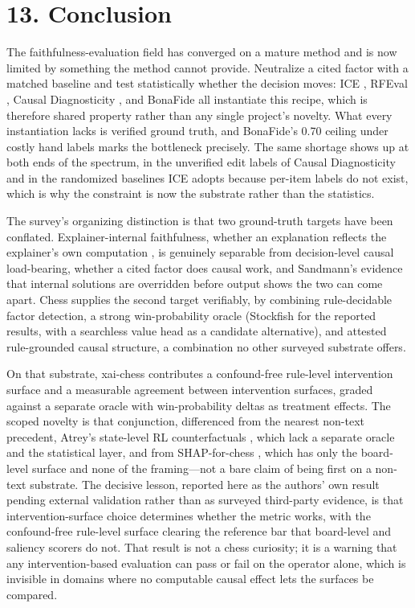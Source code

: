 \documentclass[conference]{IEEEtran}
\begin{document}
\section*{13. Conclusion}
The faithfulness-evaluation field has converged on a mature method and is now limited by something the method cannot provide. Neutralize a cited factor with a matched baseline and test statistically whether the decision moves: ICE \cite{ref17}, RFEval \cite{ref16}, Causal Diagnosticity \cite{ref15}, and BonaFide \cite{ref14} all instantiate this recipe, which is therefore shared property rather than any single project's novelty. What every instantiation lacks is verified ground truth, and BonaFide's 0.70 ceiling under costly hand labels \cite{ref14} marks the bottleneck precisely. The same shortage shows up at both ends of the spectrum, in the unverified edit labels of Causal Diagnosticity \cite{ref15} and in the randomized baselines ICE \cite{ref17} adopts because per-item labels do not exist, which is why the constraint is now the substrate rather than the statistics.

The survey's organizing distinction is that two ground-truth targets have been conflated. Explainer-internal faithfulness, whether an explanation reflects the explainer's own computation \cite{ref30}, is genuinely separable from decision-level causal load-bearing, whether a cited factor does causal work, and Sandmann's evidence that internal solutions are overridden before output \cite{ref5} shows the two can come apart. Chess supplies the second target verifiably, by combining rule-decidable factor detection, a strong win-probability oracle (Stockfish for the reported results, with a searchless value head \cite{ref7} as a candidate alternative), and attested rule-grounded causal structure, a combination no other surveyed substrate offers.

On that substrate, xai-chess contributes a confound-free rule-level intervention surface and a measurable agreement between intervention surfaces, graded against a separate oracle with win-probability deltas as treatment effects. The scoped novelty is that conjunction, differenced from the nearest non-text precedent, Atrey's state-level RL counterfactuals \cite{ref32}, which lack a separate oracle and the statistical layer, and from SHAP-for-chess \cite{ref19}, which has only the board-level surface and none of the framing---not a bare claim of being first on a non-text substrate. The decisive lesson, reported here as the authors' own result pending external validation rather than as surveyed third-party evidence, is that intervention-surface choice determines whether the metric works, with the confound-free rule-level surface clearing the reference bar that board-level and saliency scorers do not. That result is not a chess curiosity; it is a warning that any intervention-based evaluation can pass or fail on the operator alone, which is invisible in domains where no computable causal effect lets the surfaces be compared.
\end{document}
